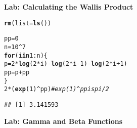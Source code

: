 \documentclass[12pt,oneside,english,american,flalign]{book}\usepackage[]{graphicx}\usepackage[]{color}
\makeatletter
\newcommand{\hlnum}[1]{\textcolor[rgb]{0.686,0.059,0.569}{#1}}%
\newcommand{\hlcom}[1]{\textcolor[rgb]{0.678,0.584,0.686}{\textit{#1}}}%
\newcommand{\hlopt}[1]{\textcolor[rgb]{0,0,0}{#1}}%
\newcommand{\hlstd}[1]{\textcolor[rgb]{0.345,0.345,0.345}{#1}}%
\newcommand{\hlkwa}[1]{\textcolor[rgb]{0.161,0.373,0.58}{\textbf{#1}}}%
\newcommand{\hlkwb}[1]{\textcolor[rgb]{0.69,0.353,0.396}{#1}}%
\newcommand{\hlkwc}[1]{\textcolor[rgb]{0.333,0.667,0.333}{#1}}%
\newcommand{\hlkwd}[1]{\textcolor[rgb]{0.737,0.353,0.396}{\textbf{#1}}}%
\newenvironment{kframe}{%
 \def\at@end@of@kframe{}%
 \ifinner\ifhmode%
  \def\at@end@of@kframe{\end{minipage}}%
  \begin{minipage}{\columnwidth}%
 \fi\fi%
 \def\FrameCommand##1{\hskip\@totalleftmargin \hskip-\fboxsep
 \colorbox{shadecolor}{##1}\hskip-\fboxsep
     \hskip-\linewidth \hskip-\@totalleftmargin \hskip\columnwidth}%
 \MakeFramed {\advance\hsize-\width
   \@totalleftmargin\z@ \linewidth\hsize
   \@setminipage}}%
 {\par\unskip\endMakeFramed%
 \at@end@of@kframe}
\newenvironment{knitrout}{}{} %
\makeatother
\begin{document}
\begin{doublespace}
\noindent \textbf{Lab: Calculating the Wallis Product}
\end{doublespace}

\begin{doublespace}
\begin{knitrout}
\color{fgcolor}\begin{kframe}
\begin{alltt}
\hlkwd{rm}\hlstd{(}\hlkwc{list}\hlstd{=}\hlkwd{ls}\hlstd{())}

\hlstd{pp} \hlkwb{=} \hlnum{0}
\hlstd{n} \hlkwb{=} \hlnum{10}\hlopt{^}\hlnum{7}
\hlkwa{for} \hlstd{(i} \hlkwa{in} \hlnum{1}\hlopt{:}\hlstd{n)\{}
    \hlstd{p} \hlkwb{=} \hlnum{2}\hlopt{*}\hlkwd{log}\hlstd{(}\hlnum{2}\hlopt{*}\hlstd{i)} \hlopt{-} \hlkwd{log}\hlstd{(}\hlnum{2}\hlopt{*}\hlstd{i}\hlopt{-}\hlnum{1}\hlstd{)} \hlopt{-} \hlkwd{log}\hlstd{(}\hlnum{2}\hlopt{*}\hlstd{i}\hlopt{+}\hlnum{1}\hlstd{)}
    \hlstd{pp} \hlkwb{=} \hlstd{p} \hlopt{+} \hlstd{pp}
\hlstd{\}}
\hlnum{2}\hlopt{*}\hlstd{(}\hlkwd{exp}\hlstd{(}\hlnum{1}\hlstd{)}\hlopt{^}\hlstd{pp)} \hlcom{# exp(1)^pp is pi/2}
\end{alltt}
\begin{verbatim}
## [1] 3.141593
\end{verbatim}
\end{kframe}
\end{knitrout}
\end{doublespace}

\begin{doublespace}
\noindent \textbf{Lab: Gamma and Beta Functions}
\end{doublespace}
\end{document}
